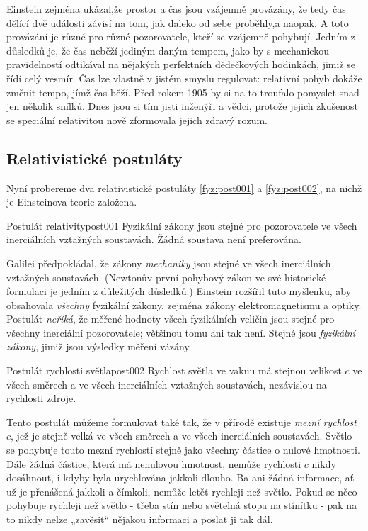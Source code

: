         Einstein zejména ukázal,že prostor a čas jsou vzájemně provázány, že tedy čas dělící dvě
        události závisí na tom, jak daleko od sebe proběhly,a naopak. A toto provázání je různé pro
        různé pozorovatele, kteří se vzájemně pohybují. Jedním z důsledků je, že čas neběží jediným
        daným tempem, jako by s mechanickou pravidelností odtikával na nějakých perfektních
        dědečkových hodinkách, jimiž se řídí celý vesmír. Čas lze vlastně v jistém smyslu regulovat:
        relativní pohyb dokáže změnit tempo, jímž čas běží. Před rokem 1905 by si na to troufalo
        pomyslet snad jen několik snílků. Dnes jsou si tím jisti inženýři a vědci, protože jejich
        zkušenost se speciální relativitou nově zformovala jejich zdravý rozum.
      
      \subsection{Relativistické postuláty}
        Nyní probereme dva relativistické postuláty \ref{fyz:post001} a \ref{fyz:post002}, na nichž
        je Einsteinova teorie založena.

        \begin{fyzpostulate}{Postulát relativity}{post001}
          Fyzikální zákony jsou stejné pro pozorovatele ve všech inerciálních vztažných soustavách.
          Žádná soustava není preferována.
        \end{fyzpostulate}

        Galilei předpokládal, že zákony \emph{mechaniky} jsou stejné ve všech inerciálních vztažných
        soustavách. (Newtonův první pohybový zákon ve své historické formulaci je jedním z
        důležitých důsledků.) Einstein rozšířil tuto myšlenku, aby obsahovala \emph{všechny}
        fyzikální zákony, zejména zákony elektromagnetismu a optiky. Postulát \emph{neříká}, že
        měřené hodnoty všech fyzikálních veličin jsou stejné pro všechny inerciální pozorovatele;
        většinou tomu ani tak není. Stejné jsou \emph{fyzikální zákony}, jimiž jsou výsledky měření
        vázány.

        \begin{fyzpostulate}{Postulát rychlosti světla}{post002}        
          Rychlost světla ve vakuu má stejnou velikost \(c\) ve všech směrech a ve všech
          inerciálních vztažných soustavách, nezávislou na rychlosti zdroje.
        \end{fyzpostulate}

        Tento postulát můžeme formulovat také tak, že v přírodě existuje \emph{mezní rychlost}
        \(c\), jež je stejně velká ve všech směrech a ve všech inerciálních soustavách. Světlo se
        pohybuje touto mezní rychlostí stejně jako všechny částice o nulové hmotnosti. Dále žádná
        částice, která má nenulovou hmotnost, nemůže rychlosti \(c\) nikdy dosáhnout, i kdyby byla
        urychlována jakkoli dlouho. Ba ani žádná informace, ať už je přenášená jakkoli a čímkoli,
        nemůže letět rychleji než světlo. Pokud se něco pohybuje rychleji než světlo - třeba stín
        nebo světelná stopa na stínítku - pak na to nikdy nelze „zavěsit“ nějakou informaci a poslat
        ji tak dál.

